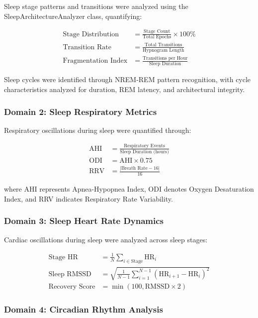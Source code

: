 \documentclass[twocolumn]{article}
\begin{document}
Sleep stage patterns and transitions were analyzed using the SleepArchitectureAnalyzer class, quantifying:

\begin{align}
\text{Stage Distribution} &= \frac{\text{Stage Count}}{\text{Total Epochs}} \times 100\% \\
\text{Transition Rate} &= \frac{\text{Total Transitions}}{\text{Hypnogram Length}} \\
\text{Fragmentation Index} &= \frac{\text{Transitions per Hour}}{\text{Sleep Duration}}
\end{align}

Sleep cycles were identified through NREM-REM pattern recognition, with cycle characteristics analyzed for duration, REM latency, and architectural integrity.

\subsubsection{Domain 2: Sleep Respiratory Metrics}

Respiratory oscillations during sleep were quantified through:

\begin{align}
\text{AHI} &= \frac{\text{Respiratory Events}}{\text{Sleep Duration (hours)}} \\
\text{ODI} &= \text{AHI} \times 0.75 \\
\text{RRV} &= \frac{|\text{Breath Rate} - 16|}{\text{16}}
\end{align}

where AHI represents Apnea-Hypopnea Index, ODI denotes Oxygen Desaturation Index, and RRV indicates Respiratory Rate Variability.

\subsubsection{Domain 3: Sleep Heart Rate Dynamics}

Cardiac oscillations during sleep were analyzed across sleep stages:

\begin{align}
\text{Stage HR} &= \frac{1}{N} \sum_{i \in \text{Stage}} \text{HR}_i \\
\text{Sleep RMSSD} &= \sqrt{\frac{1}{N-1} \sum_{i=1}^{N-1} (\text{HR}_{i+1} - \text{HR}_i)^2} \\
\text{Recovery Score} &= \min(100, \text{RMSSD} \times 2)
\end{align}

\subsubsection{Domain 4: Circadian Rhythm Analysis}
\end{document}
